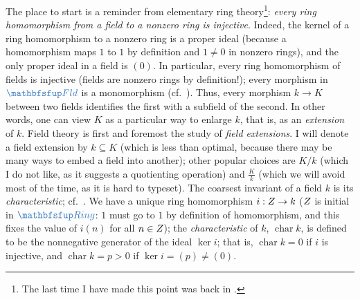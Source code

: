 The place to start is a reminder from elementary ring
theory\footnote{The last time I have made this point was back in
  .}:
\emph{every ring homomorphism from a field to a nonzero ring is
  injective}. Indeed, the kernel of a ring homomorphism to a nonzero
ring is a proper ideal (because a homomorphism maps $1$ to $1$ by
definition and $1 \neq 0$ in nonzero rings), and the only proper ideal
in a field is $(0)$. In particular, every ring homomorphism of fields
is injective (fields are nonzero rings by definition!); every morphism
in $\categ{Fld}$ is a monomorphism (cf.\
).  Thus, every morphism $k \to K$ between
two fields identifies the first with a subfield of the second. In
other words, one can view $K$ as a particular way to enlarge $k$, that
is, as an \emph{extension} of $k$. Field theory is first and foremost
the study of \emph{field extensions}. I will denote a field extension
by $k \subseteq K$ (which is less than optimal, because there may be
many ways to embed a field into another); other popular choices are
$K/k$ (which I do not like, as it suggests a quotienting operation)
and $\frac{K}{k}$ (which we will avoid most of the time, as it is hard
to typeset).  The coarsest invariant of a field $k$ is its
\emph{characteristic}; cf.\
. We have a unique ring
homomorphism $i : Z \to k$ ($Z$ is initial in $\categ{Ring}$: $1$
must go to $1$ by definition of homomorphism, and this fixes the value
of $i(n)$ for all $n \in Z$); the \emph{characteristic} of $k$,
$\operatorname{char} k$, is defined to be the nonnegative generator of
the ideal $\ker i$; that is, $\operatorname{char} k = 0$ if $i$ is
injective, and $\operatorname{char} k = p > 0$ if
$\ker i = (p) \neq (0)$.

